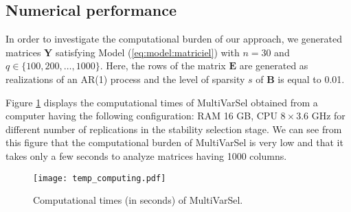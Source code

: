 \subsection{Numerical performance}

In order to investigate the computational burden of our approach, we generated matrices $\boldsymbol{Y}$
satisfying Model (\ref{eq:model:matriciel}) with $n=30$ and $q\in\{100,200,\dots,1000\}$. Here, the rows of the matrix
$\boldsymbol{E}$ are generated as realizations of an AR(1) process and the level of sparsity $s$ 
of $\boldsymbol{B}$ is equal to 0.01.

Figure \ref{fig:time} displays the computational times of \textsf{MultiVarSel}
obtained from a computer having the following configuration: RAM 16 GB, CPU $8\times 3.6$ GHz for different 
number of replications in the stability selection stage.
We can see from this figure that the computational burden  of \textsf{MultiVarSel} is very low and that it takes
only a few seconds to analyze matrices having 1000 columns.


\begin{figure}
\centering
\texttt{[image: temp\_computing.pdf]}
\caption{Computational times (in seconds) of \textsf{MultiVarSel}.\label{fig:time}}
\end{figure}

